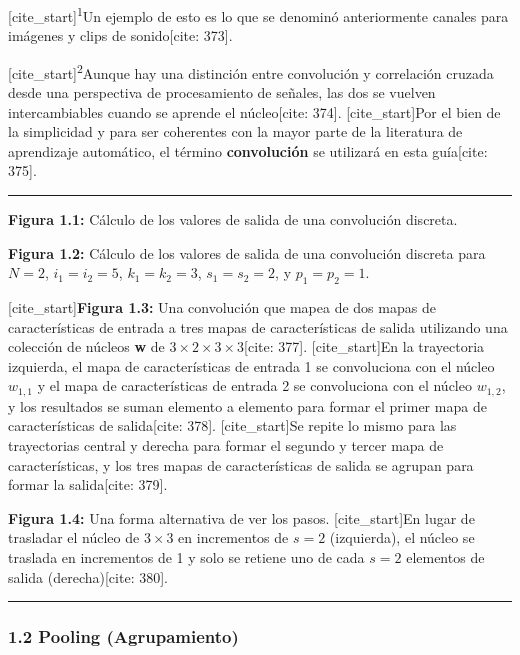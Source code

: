 \documentclass[
  super,
  preprint,
  3p]{elsarticle}
\begin{document}
{[}cite\_start{]}\textsuperscript{1}Un ejemplo de esto es lo que se
denominó anteriormente canales para imágenes y clips de sonido{[}cite:
373{]}.

{[}cite\_start{]}\textsuperscript{2}Aunque hay una distinción entre
convolución y correlación cruzada desde una perspectiva de procesamiento
de señales, las dos se vuelven intercambiables cuando se aprende el
núcleo{[}cite: 374{]}. {[}cite\_start{]}Por el bien de la simplicidad y
para ser coherentes con la mayor parte de la literatura de aprendizaje
automático, el término \textbf{convolución} se utilizará en esta
guía{[}cite: 375{]}.

\begin{center}\rule{0.5\linewidth}{0.5pt}\end{center}

\textbf{Figura 1.1:} Cálculo de los valores de salida de una convolución
discreta.

\textbf{Figura 1.2:} Cálculo de los valores de salida de una convolución
discreta para \(N=2\), \(i_1=i_2=5\), \(k_1=k_2=3\), \(s_1=s_2=2\), y
\(p_1=p_2=1\).

{[}cite\_start{]}\textbf{Figura 1.3:} Una convolución que mapea de dos
mapas de características de entrada a tres mapas de características de
salida utilizando una colección de núcleos \textbf{w} de
\(3 \times 2 \times 3 \times 3\){[}cite: 377{]}. {[}cite\_start{]}En la
trayectoria izquierda, el mapa de características de entrada 1 se
convoluciona con el núcleo \(w_{1,1}\) y el mapa de características de
entrada 2 se convoluciona con el núcleo \(w_{1,2}\), y los resultados se
suman elemento a elemento para formar el primer mapa de características
de salida{[}cite: 378{]}. {[}cite\_start{]}Se repite lo mismo para las
trayectorias central y derecha para formar el segundo y tercer mapa de
características, y los tres mapas de características de salida se
agrupan para formar la salida{[}cite: 379{]}.

\textbf{Figura 1.4:} Una forma alternativa de ver los pasos.
{[}cite\_start{]}En lugar de trasladar el núcleo de \(3 \times 3\) en
incrementos de \(s=2\) (izquierda), el núcleo se traslada en incrementos
de 1 y solo se retiene uno de cada \(s=2\) elementos de salida
(derecha){[}cite: 380{]}.

\begin{center}\rule{0.5\linewidth}{0.5pt}\end{center}

\subsubsection{1.2 Pooling (Agrupamiento)}\label{pooling-agrupamiento}
\end{document}
